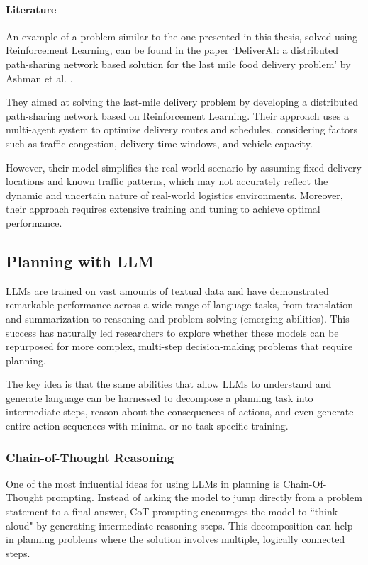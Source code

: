 \paragraph{Literature}
An example of a problem similar to the one presented in this thesis, solved using
Reinforcement Learning, can be found in the paper `DeliverAI: a distributed path-sharing
network based solution for the last mile food delivery problem' by Ashman et al.
\cite{mehra2024deliveraireinforcementlearningbased}.

They aimed at solving the last-mile delivery problem by developing a distributed
path-sharing network based on Reinforcement Learning. Their approach uses a multi-agent
system to optimize delivery routes and schedules, considering factors such as
traffic congestion, delivery time windows, and vehicle capacity.

However, their model simplifies the real-world scenario by assuming fixed delivery
locations and known traffic patterns, which may not accurately reflect the
dynamic and uncertain nature of real-world logistics environments. Moreover,
their approach requires extensive training and tuning to achieve optimal
performance.

\subsection{Planning with LLM}
\label{sub:planning_in_llm}

LLMs are trained on vast amounts of textual data and have demonstrated remarkable
performance across a wide range of language tasks, from translation and
summarization to reasoning and problem-solving (emerging abilities). This success
has naturally led researchers to explore whether these models can be repurposed for
more complex, multi-step decision-making problems that require planning.

The key idea is that the same abilities that allow LLMs to understand and
generate language can be harnessed to decompose a planning task into
intermediate steps, reason about the consequences of actions, and even generate
entire action sequences with minimal or no task-specific training.

\subsubsection{Chain-of-Thought Reasoning}

One of the most influential ideas for using LLMs in planning is Chain-Of-Thought
prompting. Instead of asking the model to jump directly from a problem statement
to a final answer, CoT prompting encourages the model to ``think aloud" by
generating intermediate reasoning steps. This decomposition can help in planning
problems where the solution involves multiple, logically connected steps.

